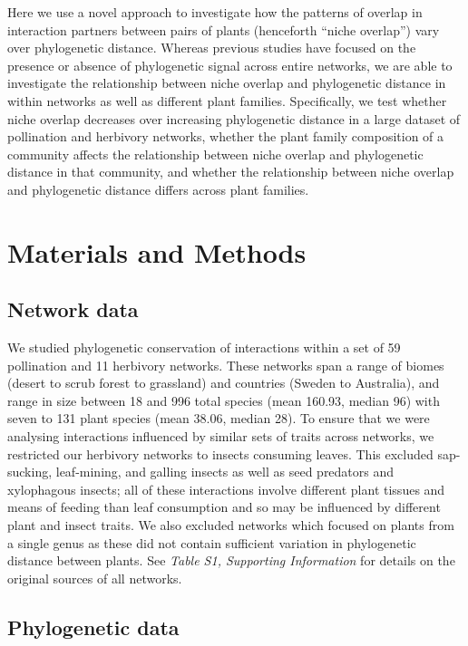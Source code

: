 \documentclass[12pt]{article}
\begin{document}
\begin{spacing}{1.5}
  Here we use a novel approach to investigate how the patterns of
  overlap in interaction partners between pairs of plants (henceforth
  ``niche overlap'') vary over phylogenetic distance. Whereas previous
  studies have focused on the presence or absence of phylogenetic
  signal across entire networks, we are able to investigate the
  relationship between niche overlap and phylogenetic distance in
  within networks as well as different plant families. Specifically,
  we test whether niche overlap decreases over increasing phylogenetic
  distance in a large dataset of pollination and herbivory networks, 
  whether the plant family composition of a community affects the
  relationship between niche overlap and phylogenetic distance in that community,
  and whether the relationship between niche overlap and phylogenetic
  distance differs across plant families.


\section*{Materials and Methods}

\subsection*{Network data}

  We studied phylogenetic conservation of interactions within a 
  set of 59 pollination and 11 herbivory networks. 
  These networks span a range of biomes 
  (desert to scrub forest to grassland) and countries (Sweden to 
  Australia), and range in size between 18 and 996 total species 
  (mean 160.93, median 96) with seven to 131 plant species (mean 38.06, 
  median 28).
  To ensure that we were analysing interactions influenced by similar
  sets of traits across networks, we restricted our herbivory 
  networks to insects consuming leaves. This excluded sap-sucking, 
  leaf-mining, and galling insects as well as seed predators and
  xylophagous insects; all of these interactions involve different 
  plant tissues and means of feeding
  than leaf consumption and so may be influenced by different
  plant and insect traits. We also excluded networks which focused on
  plants from a single genus as these did not contain sufficient
  variation in phylogenetic distance between plants.
  See \emph{Table S1, Supporting Information} for details on the original 
  sources of all networks. 


\subsection*{Phylogenetic data}


\end{spacing}
\end{document}
